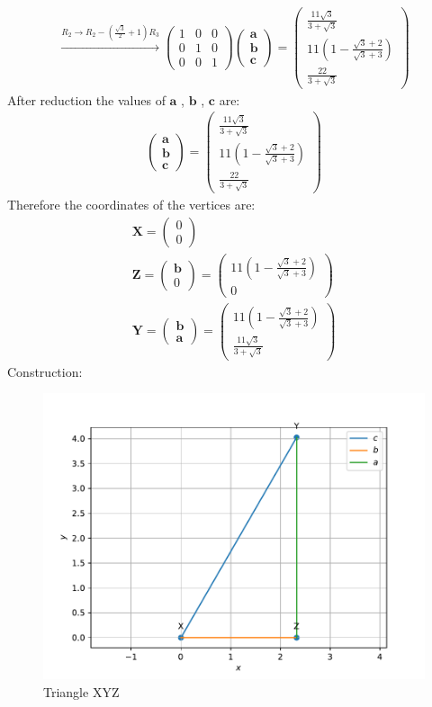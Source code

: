 \documentclass{article}
\newcommand{\myvec}[1]{\ensuremath{\begin{pmatrix}#1\end{pmatrix}}}
\let\vec\mathbf
\begin{document}
\begin{align}
	 \xrightarrow[]{R_2 \rightarrow R_2-(\frac{\sqrt{3}}{2}+1)R_3}\myvec{1 & 0 & 0 \\ 0 & 1 & 0\\0 &  0 & 1}\myvec{\vec{a}\\ \vec{b}\\ \vec{c}}= \myvec{\frac{11\sqrt{3}}{3+\sqrt{3}} \\ 11(1-\frac{\sqrt{3}+2}{\sqrt{3}+3}) \\\frac{22}{3+\sqrt{3}}}
 \end{align}
 After reduction the values of $\vec{a}$ , $\vec{b}$ , $\vec{c}$ are:
 \begin{align}
     \myvec{\vec{a}\\ \vec{b} \\ \vec{c}}=\myvec{\frac{11\sqrt{3}}{3+\sqrt{3}} \\ 11(1-\frac{\sqrt{3}+2}{\sqrt{3}+3}) \\\frac{22}{3+\sqrt{3}}}
 \end{align}
 Therefore the coordinates of the vertices are:
 \begin{align}
      \vec{X}=\myvec{0\\0}\\
      \vec{Z}=\myvec{\vec{b}\\0}=\myvec{11(1-\frac{\sqrt{3}+2}{\sqrt{3}+3}) \\ 0}\\                                               
      \vec{Y}=\myvec{\vec{b} \\ \vec{a}}=\myvec{11(1-\frac{\sqrt{3}+2}{\sqrt{3}+3}) \\ \frac{11\sqrt{3}}{3+\sqrt{3}} }
 \end{align}
 Construction:\\
 \begin{figure}[h]
	 \begin{center}
		 \includegraphics[width=\columnwidth]{code(m)/fig.pdf}
	 \end{center}
	 \caption{Triangle XYZ}
	 \label{fig:Fig1}
 \end{figure}
\end{document}

